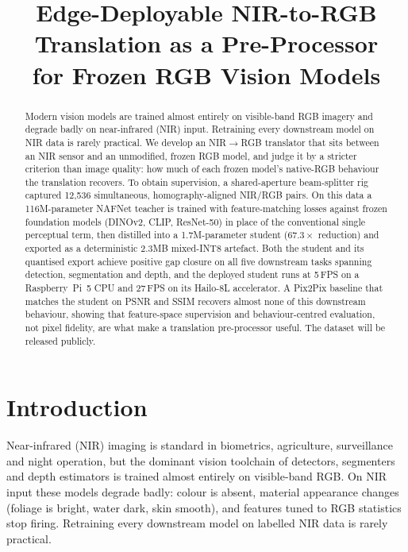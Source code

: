 \documentclass[10pt,twocolumn,letterpaper]{article}
\title{\Large\bf Edge-Deployable NIR-to-RGB Translation as a Pre-Processor\\ for Frozen RGB Vision Models}
\author{\TODO{authors}}
\date{}
\begin{document}
\maketitle

\begin{abstract}
Modern vision models are trained almost entirely on visible-band RGB imagery and degrade badly on near-infrared (NIR) input. Retraining every downstream model on NIR data is rarely practical. We develop an NIR$\rightarrow$RGB translator that sits between an NIR sensor and an unmodified, frozen RGB model, and judge it by a stricter criterion than image quality: how much of each frozen model's native-RGB behaviour the translation recovers. To obtain supervision, a shared-aperture beam-splitter rig captured 12{,}536 simultaneous, homography-aligned NIR/RGB pairs. On this data a 116M-parameter NAFNet teacher is trained with feature-matching losses against frozen foundation models (DINOv2, CLIP, ResNet-50) in place of the conventional single perceptual term, then distilled into a 1.7M-parameter student ($67.3\times$ reduction) and exported as a deterministic 2.3MB mixed-INT8 artefact. Both the student and its quantised export achieve positive gap closure on all five downstream tasks spanning detection, segmentation and depth, and the deployed student runs at 5\,FPS on a Raspberry~Pi~5 CPU and 27\,FPS on its Hailo-8L accelerator. A Pix2Pix baseline that matches the student on PSNR and SSIM recovers almost none of this downstream behaviour, showing that feature-space supervision and behaviour-centred evaluation, not pixel fidelity, are what make a translation pre-processor useful. The dataset will be released publicly.
\end{abstract}

\section{Introduction}
\label{sec:intro}

Near-infrared (NIR) imaging is standard in biometrics, agriculture, surveillance and night operation, but the dominant vision toolchain of detectors, segmenters and depth estimators is trained almost entirely on visible-band RGB. On NIR input these models degrade badly: colour is absent, material appearance changes (foliage is bright, water dark, skin smooth), and features tuned to RGB statistics stop firing. Retraining every downstream model on labelled NIR data is rarely practical.
\end{document}
